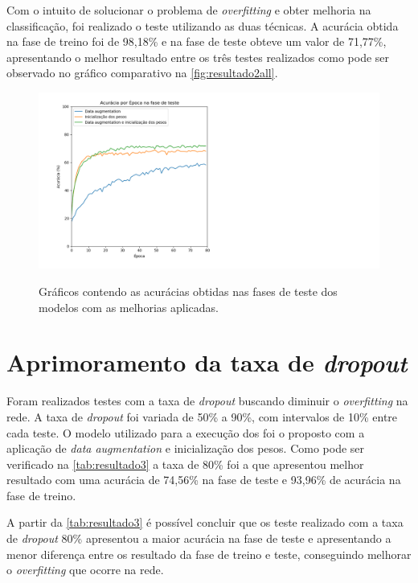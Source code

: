 \par Com o intuito de solucionar o problema de \textit{overfitting} e obter melhoria na classificação, foi realizado o teste utilizando as duas técnicas. A acurácia obtida na fase de treino foi de 98,18\% e na fase de teste obteve um valor de 71,77\%, apresentando o melhor resultado entre os três testes realizados como pode ser observado no gráfico comparativo na \autoref{fig:resultado2all}.%
\begin{figure}[H]
  \centering
  \caption{Gráficos contendo as acurácias obtidas nas fases de teste dos modelos com as melhorias aplicadas.}
  \includegraphics[width=500pt]{dados/figuras/resultado2_all}
  \label{fig:resultado2all}
\end{figure}
 
\section{Aprimoramento da taxa de \textit{dropout}}
Foram realizados testes com a taxa de \textit{dropout} buscando diminuir o \textit{overfitting} na rede. A taxa de \textit{dropout} foi variada de 50\% a 90\%, com intervalos de 10\% entre cada teste. O modelo utilizado para a execução dos foi o proposto com a aplicação de \textit{data augmentation} e inicialização dos pesos. Como pode ser verificado na \autoref{tab:resultado3} a taxa de 80\% foi a que apresentou melhor resultado com uma acurácia de 74,56\% na fase de teste e 93,96\% de acurácia na fase de treino.



\par A partir da \autoref{tab:resultado3} é possível concluir que os teste realizado com a taxa de \textit{dropout} 80\% apresentou a maior acurácia na fase de teste e  apresentando a menor diferença entre os resultado da fase de treino e teste, conseguindo melhorar o \textit{overfitting} que ocorre na rede. 

